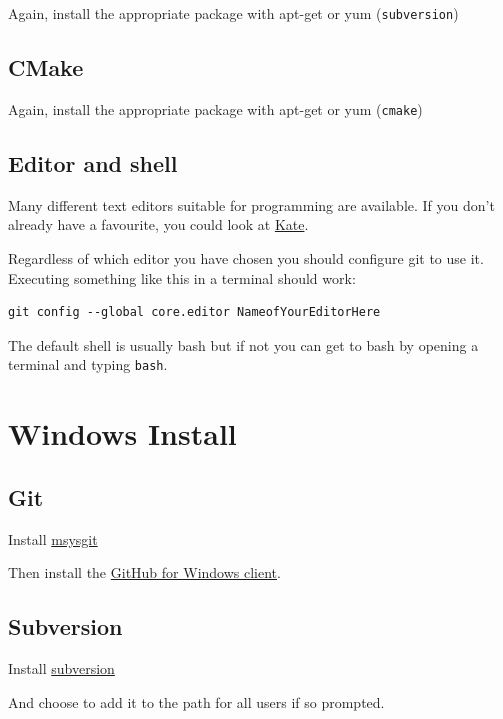 Again, install the appropriate package with apt-get or yum
(\texttt{subversion})

\subsection{CMake}\label{cmake-1}

Again, install the appropriate package with apt-get or yum
(\texttt{cmake})

\subsection{Editor and shell}\label{editor-and-shell}

Many different text editors suitable for programming are available. If
you don't already have a favourite, you could look at
\href{http://kate-editor.org/}{Kate}.

Regardless of which editor you have chosen you should configure git to
use it. Executing something like this in a terminal should work:

\begin{verbatim}
git config --global core.editor NameofYourEditorHere
\end{verbatim}

The default shell is usually bash but if not you can get to bash by
opening a terminal and typing \texttt{bash}.

\section{Windows Install}\label{windows-install}

\subsection{Git}\label{git-2}

Install
\href{http://code.google.com/p/msysgit/downloads/list?q=full+installer+official+git}{msysgit}

Then install the \href{http://windows.github.com/}{GitHub for Windows
client}.

\subsection{Subversion}\label{subversion-1}

Install \href{http://sourceforge.net/projects/win32svn/}{subversion}

And choose to add it to the path for all users if so prompted.

